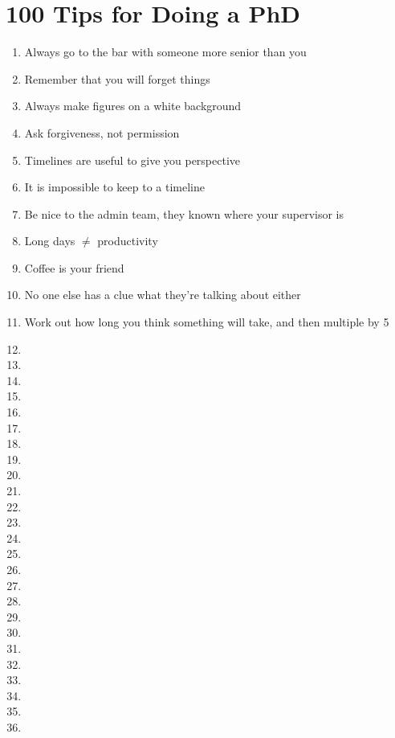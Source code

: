 %
%

\chapter{100 Tips for Doing a PhD}
\label{app:app01}

\begin{enumerate}
	\item Always go to the bar with someone more senior than you
	\item Remember that you will forget things
	\item Always make figures on a white background
	\item Ask forgiveness, not permission
	\item Timelines are useful to give you perspective
	\item It is impossible to keep to a timeline
	\item Be nice to the admin team, they known where your supervisor is
	\item Long days $\ne$ productivity
	\item Coffee is your friend
	\item No one else has a clue what they're talking about either
	\item Work out how long you think something will take, and then multiple by 5
	\item
	\item
	\item
	\item
	\item
	\item
	\item
	\item
	\item
	\item
	\item
	\item
	\item
	\item
	\item
	\item
	\item
	\item
	\item
	\item
	\item
	\item
	\item
	\item
	\item

\end{enumerate}
